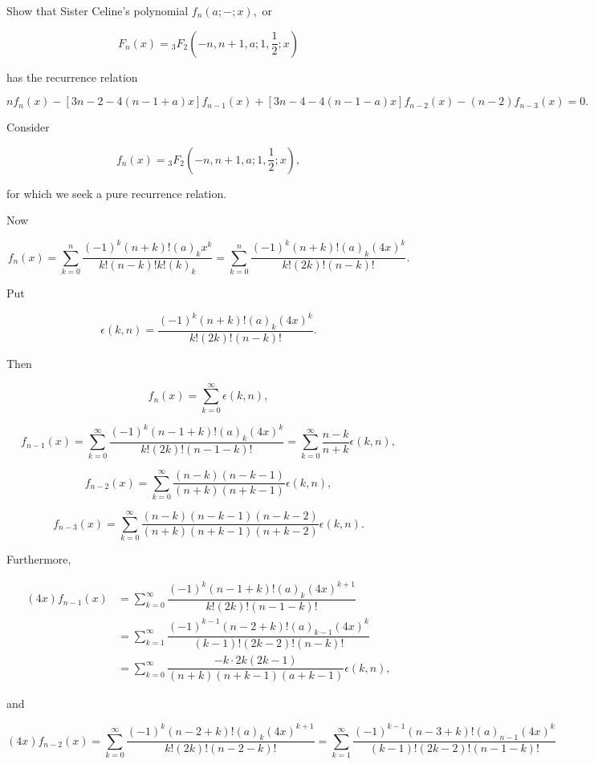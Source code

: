 \begin{problem}\label{problem2chapter14}
Show that Sister Celine's polynomial $f_n(a;-;x),$ or 

$$F_n(x) = {}_3F_2 \left(-n,n+1,a;1,\dfrac{1}{2};x \right)$$

has the recurrence relation

$$nf_n(x) - [3n-2-4(n-1+a)x]f_{n-1}(x) + [3n-4-4(n-1-a)x]f_{n-2}(x)-(n-2)f_{n-3}(x)=0.$$
\end{problem}
\begin{solution}
Consider

$$f_n(x) = {}_3F_2 \left(-n,n+1,a;1, \dfrac{1}{2};x \right),$$

for which we seek a pure recurrence relation.

Now

$$f_n(x) = \displaystyle\sum_{k=0}^n \dfrac{(-1)^k(n+k)!(a)_k x^k}{k! (n-k)!k! (k)_k} = \displaystyle\sum_{k=0}^n \dfrac{(-1)^k(n+k)!(a)_k(4x)^k}{k!(2k)!(n-k)!}.$$

Put

$$\epsilon(k,n) = \dfrac{(-1)^k(n+k)!(a)_k(4x)^k}{k!(2k)!(n-k)!}.$$

Then

$$f_n(x) = \displaystyle\sum_{k=0}^{\infty} \epsilon(k,n),$$

$$f_{n-1}(x) = \displaystyle\sum_{k=0}^{\infty} \dfrac{(-1)^k (n-1+k)!(a)_k(4x)^k}{k!(2k)!(n-1-k)!} = \displaystyle\sum_{k=0}^{\infty} \dfrac{n-k}{n+k} \epsilon(k,n),$$

$$f_{n-2}(x) = \displaystyle\sum_{k=0}^{\infty} \dfrac{(n-k)(n-k-1)}{(n+k)(n+k-1)}\epsilon(k,n),$$

$$f_{n-3}(x) = \displaystyle\sum_{k=0}^{\infty} \dfrac{(n-k)(n-k-1)(n-k-2)}{(n+k)(n+k-1)(n+k-2)} \epsilon(k,n).$$

Furthermore,

$$\begin{array}{ll}
(4x) f_{n-1}(x) &= \displaystyle\sum_{k=0}^{\infty} \dfrac{(-1)^k (n-1+k)! (a)_k (4x)^{k+1}}{k! (2k)! (n-1-k)!} \\
&= \displaystyle\sum_{k=1}^{\infty} \dfrac{(-1)^{k-1}(n-2+k)!(a)_{k-1}(4x)^k}{(k-1)! (2k-2)! (n-k)!} \\
&= \displaystyle\sum_{k=0}^{\infty} \dfrac{-k \cdot 2k(2k-1)}{(n+k)(n+k-1)(a+k-1)} \epsilon(k,n),
\end{array}$$

and

$$(4x)f_{n-2}(x) = \displaystyle\sum_{k=0}^{\infty} \dfrac{(-1)^k (n-2+k)! (a)_k(4x)^{k+1}}{k! (2k)! (n-2-k)!} = \displaystyle\sum_{k=1}^{\infty} \dfrac{(-1)^{k-1}(n-3+k)! (a)_{n-1} (4x)^k}{(k-1)! (2k-2)! (n-1-k)!}$$


\end{solution}

